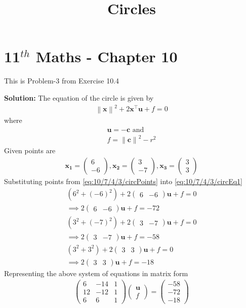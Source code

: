 \documentclass[12pt]{article}
\providecommand{\brak}[1]{\ensuremath{\left(#1\right)}}
\providecommand{\norm}[1]{\left\lVert#1\right\rVert}
\newcommand{\solution}{\noindent \textbf{Solution: }}
\newcommand{\myvec}[1]{\ensuremath{\begin{pmatrix}#1\end{pmatrix}}}
\let\vec\mathbf
\begin{document}
\begin{center}
\title{\textbf{Circles}}
\date{\vspace{-5ex}} %
\maketitle
\end{center}
\setcounter{page}{1}

\section{11$^{th}$ Maths - Chapter 10}
This is Problem-3 from Exercise 10.4
\begin{enumerate}
\solution 
\fi
The equation of the circle is given by 
\begin{align}
	\label{eq:10/7/4/3/circEq1}
	\norm{\vec{x}}^2+2\vec{x}^\top\vec{u}+f = 0 
\end{align}
where
\begin{align}
	\vec{u} = -\vec{c} \text{ and } \\
        \label{eq:10/7/4/3/fRelation}
	f = \norm{\vec{c}}^2 - r^2
\end{align}
Given points are 
\begin{align}
	\label{eq:10/7/4/3/circPoints}
     \vec{x_1} = \myvec{6 \\ -6} , \vec{x_2} = \myvec{3 \\-7}, \vec{x_3}= \myvec{3 \\ 3}
\end{align}
Substituting points from \eqref{eq:10/7/4/3/circPoints} into \eqref{eq:10/7/4/3/circEq1}
\begin{align}
	\brak{6^2 + \brak{-6}^2}+2\myvec{6 & -6}\vec{u}+f = 0 \\ 
	\implies 2\myvec{6 & -6}\vec{u} + f = -72 \\ 
	\brak{3^2 + \brak{-7}^2}+2\myvec{3 & -7}\vec{u}+f = 0 \\ 
	\implies 2\myvec{3 & -7}\vec{u} + f = -58 \\
	\brak{3^2 + 3^2}+2\myvec{3 & 3}\vec{u}+f = 0 \\ 
	\implies 2\myvec{3 & 3}\vec{u} + f = -18 
\end{align}
Representing the above system of equations in matrix form
\begin{align}
 \myvec{6 & -14 & 1 \\
	12 & -12 & 1 \\
	6 & 6 & 1
	} \myvec {\vec{u} \\
	           f 
		}  = \myvec{-58 \\ -72 \\ -18 }
\end{align}


\end{enumerate}
\end{document}
